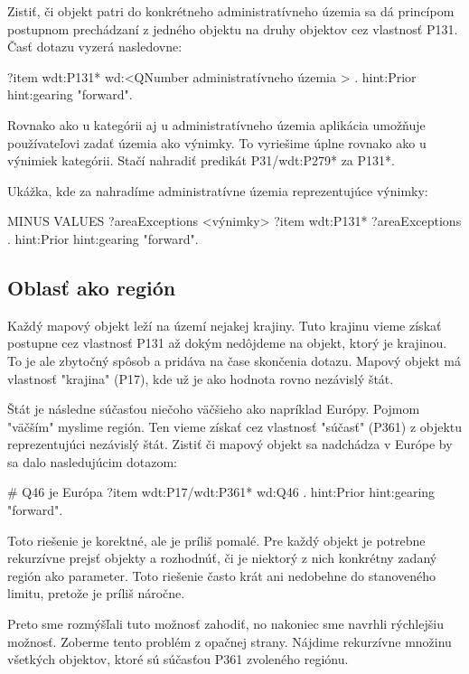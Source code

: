 Zistiť, či objekt patri do konkrétneho administratívneho územia sa dá princípom postupnom prechádzaní z jedného objektu na druhy objektov cez vlastnosť P131. 
Časť dotazu vyzerá nasledovne: 
\begin{code}
      ?item wdt:P131* wd:<QNumber administratívneho územia > .
      hint:Prior hint:gearing "forward".
\end{code}

Rovnako ako u kategórii aj u administratívneho územia aplikácia umožňuje používateľovi zadať územia ako výnimky. To vyriešime úplne rovnako ako u 
výnimiek kategórii. Stačí nahradiť predikát P31/wdt:P279* za P131*. 

Ukážka, kde za  nahradíme administratívne územia reprezentujúce výnimky: 
\begin{code}
      MINUS{
      VALUES ?areaExceptions {<výnimky>  }
      ?item wdt:P131* ?areaExceptions .
      hint:Prior hint:gearing "forward".
      }
\end{code}

\subsection*{Oblasť ako región}
Každý mapový objekt leží na území nejakej krajiny. Tuto krajinu vieme získať postupne cez vlastnosť P131 až dokým nedôjdeme na objekt, ktorý je krajinou. 
To je ale zbytočný spôsob a pridáva na čase skončenia dotazu. Mapový objekt má vlastnosť "krajina" (P17), kde už je ako hodnota rovno nezávislý štát. 

Štát je následne súčasťou niečoho väčšieho ako napríklad Európy. Pojmom "väčším" myslime región. Ten vieme získať cez vlastnosť 
"súčasť" (P361) z objektu reprezentujúci nezávislý štát. 
Zistiť či mapový objekt sa nadchádza v Európe by sa dalo nasledujúcim dotazom: 
\begin{code}
      # Q46 je Európa
      ?item wdt:P17/wdt:P361* wd:Q46 .
      hint:Prior hint:gearing "forward".
\end{code}

Toto riešenie je korektné, ale je príliš pomalé. Pre každý objekt je potrebne rekurzívne prejsť 
objekty a rozhodnúť, či je niektorý z nich konkrétny zadaný región ako parameter. Toto riešenie často krát ani nedobehne do stanoveného limitu, pretože je príliš náročne. 

Preto sme rozmýšľali tuto možnosť zahodiť, no nakoniec sme navrhli rýchlejšiu možnosť. 
Zoberme tento problém z opačnej strany. Nájdime rekurzívne množinu všetkých objektov, ktoré sú súčasťou P361 zvoleného regiónu. 

